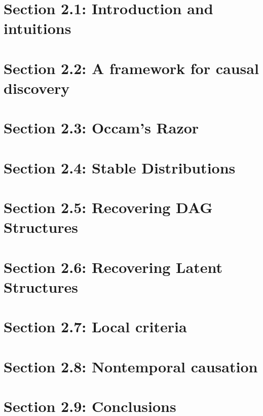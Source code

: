 \documentclass[oneside]{book}
\begin{document}
\section{Section 2.1: Introduction and intuitions}



\section{Section 2.2: A framework for causal discovery}



\section{Section 2.3: Occam's Razor}



\section{Section 2.4: Stable Distributions}



\section{Section 2.5: Recovering DAG Structures}



\section{Section 2.6: Recovering Latent Structures}



\section{Section 2.7: Local criteria}



\section{Section 2.8: Nontemporal causation}



\section{Section 2.9: Conclusions}
\end{document}
